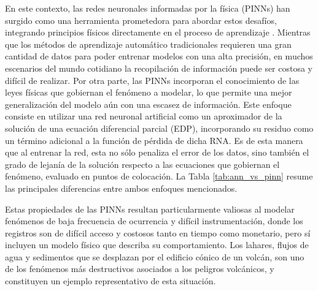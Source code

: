 En este contexto, las redes neuronales informadas por la física (PINNs) han surgido como una herramienta prometedora para abordar estos desafíos, integrando principios físicos directamente en el proceso de aprendizaje \cite{RAISSI2019686}.
Mientras que los métodos de aprendizaje automático tradicionales requieren una gran cantidad de datos para poder entrenar modelos con una alta precisión, en muchos escenarios del mundo cotidiano
la recopilación de información puede ser costosa y difícil de realizar. Por otra parte, las PINNs incorporan el conocimiento de las leyes físicas que gobiernan el fenómeno a modelar, lo que permite una mejor generalización del modelo
aún con una escasez de información. Este enfoque consiste en utilizar una red neuronal artificial como un aproximador de la solución de una ecuación diferencial parcial (EDP), incorporando su residuo como un término adicional
a la función de pérdida de dicha RNA. Es de esta manera que al entrenar la red, esta no sólo penaliza el error de los datos, sino también el grado de lejanía de la solución respecto a las ecuaciones que gobiernan el fenómeno, evaluado en puntos de colocación.
La Tabla \ref{tab:ann_vs_pinn} resume las principales diferencias entre ambos enfoques mencionados. 


Estas propiedades de las PINNs resultan particularmente valiosas al modelar fenómenos de baja frecuencia de ocurrencia y difícil instrumentación, donde los registros son de difícil acceso y costosos tanto en tiempo como monetario, pero sí 
incluyen un modelo físico que describa su comportamiento. Los lahares, flujos de agua y sedimentos que se desplazan por el edificio cónico de un volcán, son uno de los fenómenos más destructivos asociados a los peligros volcánicos, y constituyen
un ejemplo representativo de esta situación.

